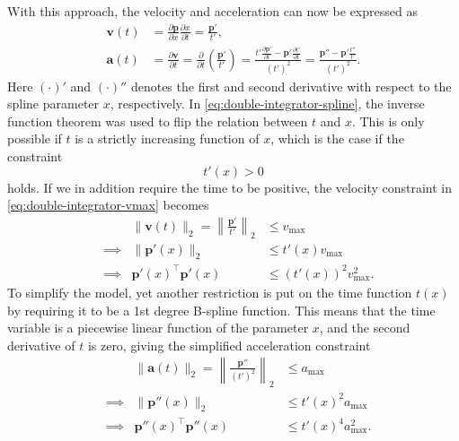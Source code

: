 With this approach, the velocity and acceleration can now be expressed as
\begin{subequations}\label{eq:double-integrator-spline}
    \begin{align}
        \mathbf{v}(t) &= \frac{\partial \mathbf{p}}{\partial x} \frac{\partial x}{\partial t} = \frac{\mathbf{p}'}{t'},
        \label{eq:double-integrator-v-spline} \\
        \mathbf{a}(t) &= \frac{\partial \mathbf{v}}{\partial t} = \frac{\partial}{\partial t} \left(\frac{\mathbf{p}'}{t'}\right) = 
        \frac{
            t'\frac{\partial \mathbf{p}'}{\partial t} - \mathbf{p}'\frac{\partial t'}{\partial t}
            }{(t')^2} = 
        \frac{\mathbf{p}'' - \mathbf{p}'\frac{t''}{t'}}{(t')^2}.
        \label{eq:double-integrator-a-spline}
    \end{align}
\end{subequations}
Here $(\cdot)'$ and $(\cdot)''$ denotes the first and second derivative with respect to the spline parameter $x$, respectively. In \cref{eq:double-integrator-spline}, the inverse function theorem was used to flip the relation between $t$ and $x$. This is only possible if $t$ is a strictly increasing function of $x$, which is the case if the constraint 
\begin{equation}\label{eq:constraint-t}
    t'(x) > 0
\end{equation}
holds.  
If we in addition require the time to be positive, the velocity constraint in \cref{eq:double-integrator-vmax} becomes
\begin{equation}\label{eq:double-integrator-vmax-spline}
    \begin{aligned}
        &&\|\mathbf{v}(t)\|_2 = \left\|\frac{\mathbf{p}'}{t'}\right\|_2 &\leq v_{\max} \\
        &\implies& \|\mathbf{p}'(x)\|_2 &\leq t'(x)v_{\max} \\
        &\implies& \mathbf{p}'(x)^\top\mathbf{p}'(x) &\leq (t'(x))^2v_{\max}^2.
    \end{aligned}
\end{equation}
To simplify the model, yet another restriction is put on the time function $t(x)$ by requiring it to be a 1st degree B-spline function. This means that the time variable is a piecewise linear function of the parameter $x$, and the second derivative of $t$ is zero, giving the simplified acceleration constraint
\begin{equation}\label{eq:double-integrator-a-spline-simplified}
    \begin{aligned}
        &&\|\mathbf{a}(t)\|_2 = \left\|\frac{\mathbf{p}''}{(t')^2}\right\|_2 &\leq a_{\max} \\
        &\implies& \|\mathbf{p}''(x)\|_2 &\leq t'(x)^2a_{\max} \\
        &\implies& \mathbf{p}''(x)^\top\mathbf{p}''(x) &\leq t'(x)^4a_{\max}^2.
    \end{aligned}
\end{equation}

